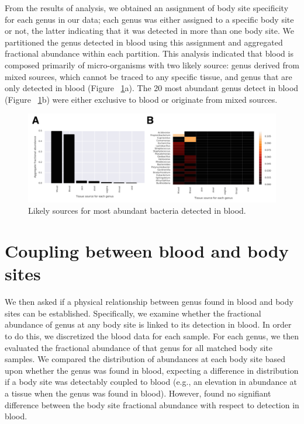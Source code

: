 From the results of analysis, we obtained an assignment of body site specificity for each genus in our data; each genus was either assigned to a specific body site or not, the latter indicating that it was detected in more than one body site. We partitioned the genus detected in blood using this assignment and aggregated fractional abundance within each partition. This analysis indicated that blood is composed primarily of micro-organisms with two likely source: genus derived from mixed sources, which cannot be traced to any specific tissue, and genus that are only detected in blood (Figure ~\ref{fig:Fig14}a). The 20 most abundant genus detect in blood (Figure ~\ref{fig:Fig14}b) were either exclusive to blood or originate from mixed sources. 

\begin{figure}
\center\includegraphics[width=150mm,scale=0.5]{Figures/Fig14}
\caption{Likely sources for most abundant bacteria detected in blood.}
\label{fig:Fig14}
\end{figure}

\section{Coupling between blood and body sites}

We then asked if a physical relationship between genus found in blood and  body sites can be established. Specifically, we examine whether the fractional abundance of genus at any body site is linked to its detection in blood. In order to do this, we discretized the blood data for each sample. For each genus, we then evaluated the fractional abundance of that genus for all matched body site samples. We compared the distribution of abundances at each body site based upon whether the genus was found in blood, expecting a difference in distribution if a body site was detectably coupled to blood (e.g., an elevation in abundance at a tissue when the genus was found in blood). However, found no signifiant difference between the body site fractional abundance with respect to detection in blood. 

